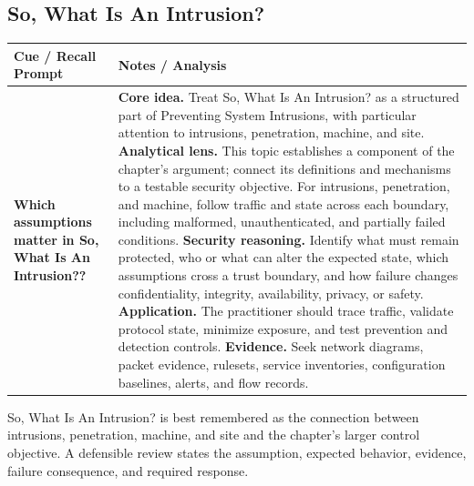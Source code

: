 \documentclass[11pt]{article}
\newcommand{\CornellHeader}{%
\rowcolor{Navy}\color{white}\bfseries Cue / Recall Prompt & \color{white}\bfseries Notes / Analysis\\\hline}
\newcommand{\CornellRow}[2]{%
\cellcolor{CueGray}\RaggedRight\textbf{#1} & \RaggedRight #2\\\hline}
\begin{document}
\subsection*{So, What Is An Intrusion?}
\begin{longtable}{>{\RaggedRight\arraybackslash}p{}|>{\RaggedRight\arraybackslash}p{}}
\CornellHeader
\CornellRow{Which assumptions matter in So, What Is An Intrusion??}{\textbf{Core idea.} Treat So, What Is An Intrusion? as a structured part of Preventing System Intrusions, with particular attention to intrusions, penetration, machine, and site. \textbf{Analytical lens.} This topic establishes a component of the chapter's argument; connect its definitions and mechanisms to a testable security objective. For intrusions, penetration, and machine, follow traffic and state across each boundary, including malformed, unauthenticated, and partially failed conditions. \textbf{Security reasoning.} Identify what must remain protected, who or what can alter the expected state, which assumptions cross a trust boundary, and how failure changes confidentiality, integrity, availability, privacy, or safety. \textbf{Application.} The practitioner should trace traffic, validate protocol state, minimize exposure, and test prevention and detection controls. \textbf{Evidence.} Seek network diagrams, packet evidence, rulesets, service inventories, configuration baselines, alerts, and flow records.}
\end{longtable}
\begin{topicsummary}
So, What Is An Intrusion? is best remembered as the connection between intrusions, penetration, machine, and site and the chapter's larger control objective. A defensible review states the assumption, expected behavior, evidence, failure consequence, and required response.
\end{topicsummary}
\end{document}
